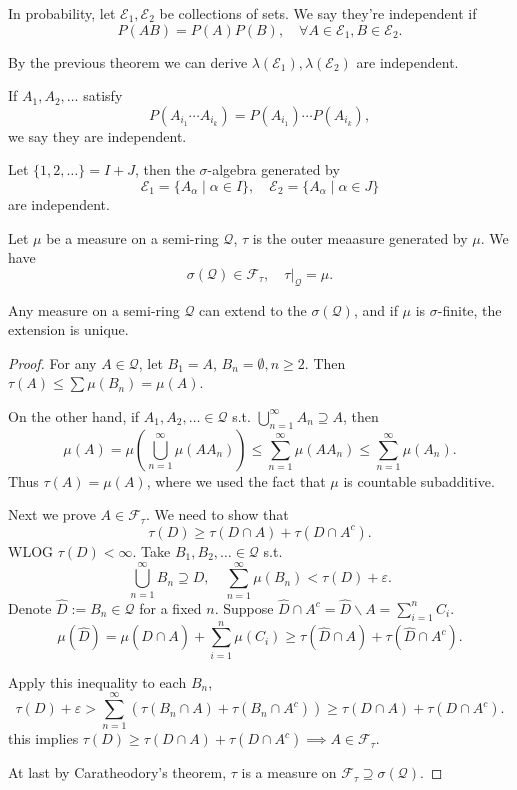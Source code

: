 \begin{example}
    In probability, let $\mathscr{E}_1, \mathscr{E}_2$ be collections of sets.
	We say they're independent if
	\[
	P(AB) = P(A)P(B), \quad \forall A\in \mathscr{E}_1, B\in \mathscr{E}_2.
	\]

	By the previous theorem we can derive
	$\lambda(\mathscr{E}_1),\lambda(\mathscr{E}_2)$ are independent.

	If  $A_1,A_2,\dots$ satisfy
	\[
		P(A_{i_1}\cdots A_{i_k}) = P(A_{i_1}) \cdots P(A_{i_k}),
	\]
	we say they are independent.

	Let $\{1,2,\dots\} = I+J$, then the $\sigma$-algebra generated by
	\[
	\mathscr{E}_1 = \{A_\alpha\mid \alpha\in I\},\quad
	\mathscr{E}_2 = \{A_\alpha\mid \alpha\in J\}
	\]
	are independent.
\end{example}

\begin{theorem}
    Let $\mu$ be a measure on a semi-ring $\mathscr{Q}$, $\tau$ is the
	outer meaasure generated by $\mu$. We have
	\[
	\sigma(\mathscr{Q})\in \mathscr{F}_\tau,\quad \tau|_{\mathscr{Q}} = \mu.
	\]
\end{theorem}
\begin{remark}
    Any measure on a semi-ring $\mathscr{Q}$ can extend to the $\sigma(\mathscr{Q})$,
	and if  $\mu$ is $\sigma$-finite, the extension is unique.
\end{remark}

\begin{proof}[Proof]
    For any $A\in \mathscr{Q}$, let $B_1=A$, $B_n = \emptyset, n\ge 2$.
	Then $\tau(A)\le \sum\mu(B_n) = \mu(A)$.

	On the other hand, if  $A_1,A_2,\dots\in \mathscr{Q}$ s.t.
	$\bigcup_{n=1}^\infty A_n \supseteq A$, then
	\[
	\mu(A) = \mu\left(\bigcup_{n=1}^\infty \mu(AA_n)\right)
	\le \sum_{n=1}^{\infty} \mu(AA_n) \le \sum_{n=1}^{\infty} \mu(A_n).
	\]
	Thus $\tau(A) = \mu(A)$, where we used the fact that $\mu$ is countable subadditive.

	Next we prove $A\in \mathscr{F}_\tau$.
	We need to show that
	\[
	\tau(D) \ge \tau(D\cap A) + \tau(D\cap A^c).
	\]
	WLOG $\tau(D)<\infty$.
	Take $B_1,B_2,\dots \in \mathscr{Q}$ s.t.
	\[
	\bigcup_{n=1}^\infty B_n \supseteq D,\quad
	\sum_{n=1}^{\infty}\mu(B_n) < \tau(D)+\varepsilon.
	\]
	Denote $\hat{D} := B_n\in \mathscr{Q}$ for a fixed $n$.
	Suppose $\hat{D}\cap A^c = \hat{D}\backslash A = \sum_{i=1}^{n} C_i$.
	\[
	\mu(\hat{D}) = \mu(\hat{D}\cap A) + \sum_{i=1}^{n} \mu(C_i)
	\ge \tau(\hat{D}\cap A) + \tau(\hat{D}\cap A^c).
	\]

	Apply this inequality to each $B_n$,
	\[
	\tau(D)+\varepsilon > \sum_{n=1}^{\infty} (\tau(B_n\cap A) + \tau(B_n\cap A^c))
	\ge \tau(D\cap A) + \tau(D\cap A^c).
	\]
	this implies $\tau(D)\ge \tau(D\cap A) + \tau(D\cap A^c)
	\implies A\in \mathscr{F}_\tau$.

	At last by Caratheodory's theorem,
	$\tau$ is a measure on $\mathscr{F}_\tau\supseteq \sigma(\mathscr{Q})$.
\end{proof}

